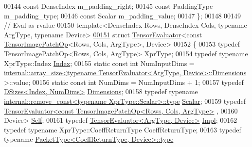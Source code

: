 \begin{DoxyCode}
00144     \textcolor{keyword}{const} DenseIndex m\_padding\_right;
00145     \textcolor{keyword}{const} PaddingType m\_padding\_type;
00146     \textcolor{keyword}{const} Scalar m\_padding\_value;
00147 \};
00148 
00149 \textcolor{comment}{// Eval as rvalue}
00150 \textcolor{keyword}{template}<DenseIndex Rows, DenseIndex Cols, \textcolor{keyword}{typename} ArgType, \textcolor{keyword}{typename} Device>
\hyperlink{struct_eigen_1_1_tensor_evaluator_3_01const_01_tensor_image_patch_op_3_01_rows_00_01_cols_00_01_arg_type_01_4_00_01_device_01_4}{00151} \textcolor{keyword}{struct }\hyperlink{struct_eigen_1_1_tensor_evaluator}{TensorEvaluator}<const \hyperlink{class_eigen_1_1_tensor_image_patch_op}{TensorImagePatchOp}<Rows, Cols, ArgType>, 
      Device>
00152 \{
00153   \textcolor{keyword}{typedef} \hyperlink{class_eigen_1_1_tensor_image_patch_op}{TensorImagePatchOp<Rows, Cols, ArgType>} 
      \hyperlink{class_eigen_1_1_tensor_image_patch_op}{XprType};
00154   \textcolor{keyword}{typedef} \textcolor{keyword}{typename} XprType::Index \hyperlink{namespace_eigen_a62e77e0933482dafde8fe197d9a2cfde}{Index};
00155   \textcolor{keyword}{static} \textcolor{keyword}{const} \textcolor{keywordtype}{int} NumInputDims = 
      \hyperlink{struct_eigen_1_1internal_1_1array__size}{internal::array\_size<typename TensorEvaluator<ArgType, Device>::Dimensions}
      >::value;
00156   \textcolor{keyword}{static} \textcolor{keyword}{const} \textcolor{keywordtype}{int} NumDims = NumInputDims + 1;
00157   \textcolor{keyword}{typedef} \hyperlink{struct_eigen_1_1_d_sizes}{DSizes<Index, NumDims>} \hyperlink{struct_eigen_1_1_d_sizes}{Dimensions};
00158   \textcolor{keyword}{typedef} \textcolor{keyword}{typename} \hyperlink{group___sparse_core___module}{internal::remove\_const<typename XprType::Scalar>::type}
       \hyperlink{group___sparse_core___module}{Scalar};
00159   \textcolor{keyword}{typedef} \hyperlink{struct_eigen_1_1_tensor_evaluator}{TensorEvaluator<const TensorImagePatchOp<Rows, Cols, ArgType>}
      ,
00160                           Device> \hyperlink{struct_eigen_1_1_tensor_evaluator_3_01const_01_tensor_image_patch_op_3_01_rows_00_01_cols_00_01_arg_type_01_4_00_01_device_01_4}{Self};
00161   \textcolor{keyword}{typedef} \hyperlink{struct_eigen_1_1_tensor_evaluator}{TensorEvaluator<ArgType, Device>} \hyperlink{struct_eigen_1_1_tensor_evaluator}{Impl};
00162   \textcolor{keyword}{typedef} \textcolor{keyword}{typename} XprType::CoeffReturnType CoeffReturnType;
00163   \textcolor{keyword}{typedef} \textcolor{keyword}{typename} \hyperlink{group___sparse_core___module}{PacketType<CoeffReturnType, Device>::type} 

\end{DoxyCode}
